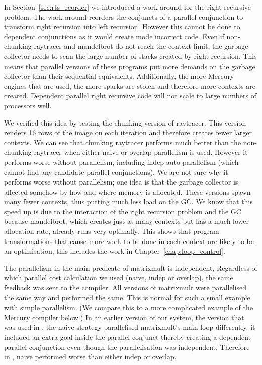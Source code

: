 In Section~\ref{sec:rts_reorder} we introduced a work around for the
right recursive problem.
The work around reorders the conjuncts of a parallel conjunction to
transform right recursion into left recursion.
However this cannot be done to dependent conjunctions as it would create
mode incorrect code.
Even if non-chunking raytracer and mandelbrot do not reach the context limit,
the garbage collector needs to scan the large number of stacks created by
right recursion.
This means that parallel versions of these programs put more demands on the
garbage collector than their sequential equivalents.
Additionally,
the more Mercury engines that are used, the more sparks are stolen and
therefore more contexts are created.
Dependent parallel right recursive code will not scale to large numbers of
processors well.

We verified this idea by testing the chunking version of raytracer.
This version renders 16 rows of the image on each iteration and therefore
creates fewer larger contexts.
We can see that chunking raytracer performs much better than the
non-chunking raytracer when either naive or overlap parallelism is used.
However it performs worse without parallelism, including indep
auto-parallelism (which cannot find any candidate parallel conjunctions).
We are not sure why it performs worse without parallelism;
one idea is that the garbage collector is affected somehow by how and where
memory is allocated.
These versions spawn many fewer contexts, thus putting much less load
on the GC.
We know that this speed up is due to the interaction of the right recursion
problem and the GC because mandelbrot,
which creates just as many contexts but has a much lower allocation rate,
already runs very optimally.
This shows that
program transformations that cause more work to be done in each context
are likely to be an optimisation,
this includes the work in Chapter~\ref{chap:loop_control}.

The parallelism in the main predicate of matrixmult is independent,
Regardless of which parallel cost calculation we used (naive, indep or
overlap),
the same feedback was sent to the compiler.
All versions of matrixmult were parallelised the same way and performed the
same.
This is normal for such a small example with simple parallelism.
(We compare this to a more complicated example of the Mercury compiler
below.)
In an earlier version of our system,
the version that was used in \citet*{bone:2011:overlap},
the naive strategy parallelised matrixmult's main loop
differently,
it included an extra goal inside the parallel conjunct thereby creating
a dependent parallel conjunction even though the parallelisation was
independent.
Therefore in \citet*{bone:2011:overlap},
naive performed worse than either indep or overlap.

